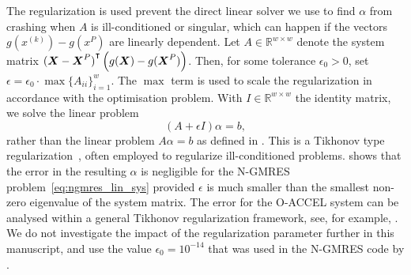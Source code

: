 \documentclass[main.tex]{subfiles}
\begin{document}
The regularization is used prevent the direct linear solver we use to
find $\alpha$ from crashing when $A$ is ill-conditioned or singular,
which can happen if the vectors $g(x^{(k)})-g(x^P)$ are linearly
dependent.  Let $A\in\mathbb R^{w\times w}$ denote the system matrix
${(\boldsymbol{X}-\boldsymbol{X}^P)}^\intercal\left(
  g(\boldsymbol{X})-g(\boldsymbol{X}^P) \right)$.  Then, for some
tolerance $\epsilon_0>0$, set
$\epsilon=\epsilon_0\cdot\max{\{A_{ii}\}}_{i=1}^w$. The $\max$ term is
used to scale the regularization in accordance with the optimisation
problem.  With $I\in\mathbb{R}^{w\times w}$ the identity matrix, we
solve the linear problem
\begin{equation}
  (A+\epsilon I)\alpha = b,
\end{equation}
rather than the linear problem $A\alpha=b$ as defined in
.  This is a Tikhonov type
regularization~\cite{neumaier1998solving}, often employed to
regularize ill-conditioned problems.  \citet{washio1997krylov} shows
that the error in the resulting $\alpha$ is negligible for the N-GMRES
problem~\eqref{eq:ngmres_lin_sys} provided $\epsilon$ is much smaller
than the smallest non-zero eigenvalue of the system matrix.  The error
for the O-ACCEL system can be analysed within a general Tikhonov
regularization framework, see, for example,
\citet{neumaier1998solving}. We do not investigate the impact of the
regularization parameter further in this manuscript, and use the value
$\epsilon_0=10^{-14}$ that was used in the N-GMRES code by
\citet{sterck2013steepest}.
\end{document}

